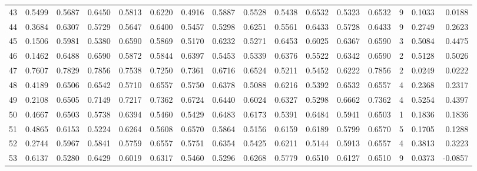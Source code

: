 \begin{tabular}{lrrrrrrrrrrrrrrr}
43  &      0.5499 &  0.5687 &  0.6450 &  0.5813 &  0.6220 &  0.4916 &  0.5887 &  0.5528 &  0.5438 &  0.6532 &   0.5323 &     0.6532 &      9 &                    0.1033 &                     0.0188 \\
44  &      0.3684 &  0.6307 &  0.5729 &  0.5647 &  0.6400 &  0.5457 &  0.5298 &  0.6251 &  0.5561 &  0.6433 &   0.5728 &     0.6433 &      9 &                    0.2749 &                     0.2623 \\
45  &      0.1506 &  0.5981 &  0.5380 &  0.6590 &  0.5869 &  0.5170 &  0.6232 &  0.5271 &  0.6453 &  0.6025 &   0.6367 &     0.6590 &      3 &                    0.5084 &                     0.4475 \\
46  &      0.1462 &  0.6488 &  0.6590 &  0.5872 &  0.5844 &  0.6397 &  0.5453 &  0.5339 &  0.6376 &  0.5522 &   0.6342 &     0.6590 &      2 &                    0.5128 &                     0.5026 \\
47  &      0.7607 &  0.7829 &  0.7856 &  0.7538 &  0.7250 &  0.7361 &  0.6716 &  0.6524 &  0.5211 &  0.5452 &   0.6222 &     0.7856 &      2 &                    0.0249 &                     0.0222 \\
48  &      0.4189 &  0.6506 &  0.6542 &  0.5710 &  0.6557 &  0.5750 &  0.6378 &  0.5088 &  0.6216 &  0.5392 &   0.6532 &     0.6557 &      4 &                    0.2368 &                     0.2317 \\
49  &      0.2108 &  0.6505 &  0.7149 &  0.7217 &  0.7362 &  0.6724 &  0.6440 &  0.6024 &  0.6327 &  0.5298 &   0.6662 &     0.7362 &      4 &                    0.5254 &                     0.4397 \\
50  &      0.4667 &  0.6503 &  0.5738 &  0.6394 &  0.5460 &  0.5429 &  0.6483 &  0.6173 &  0.5391 &  0.6484 &   0.5941 &     0.6503 &      1 &                    0.1836 &                     0.1836 \\
51  &      0.4865 &  0.6153 &  0.5224 &  0.6264 &  0.5608 &  0.6570 &  0.5864 &  0.5156 &  0.6159 &  0.6189 &   0.5799 &     0.6570 &      5 &                    0.1705 &                     0.1288 \\
52  &      0.2744 &  0.5967 &  0.5841 &  0.5759 &  0.6557 &  0.5751 &  0.6354 &  0.5425 &  0.6211 &  0.5144 &   0.5913 &     0.6557 &      4 &                    0.3813 &                     0.3223 \\
53  &      0.6137 &  0.5280 &  0.6429 &  0.6019 &  0.6317 &  0.5460 &  0.5296 &  0.6268 &  0.5779 &  0.6510 &   0.6127 &     0.6510 &      9 &                    0.0373 &                    -0.0857 \\

\end{tabular}
